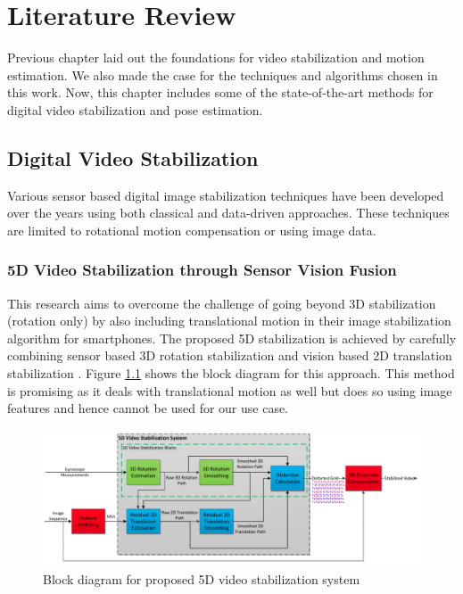 \chapter{Literature Review} \label{chapter_three}

Previous chapter laid out the foundations for video stabilization and motion estimation. We also made the case for the techniques and algorithms chosen in this work. Now, this chapter includes some of the state-of-the-art methods for digital video stabilization and pose estimation. 

\section{Digital Video Stabilization}
Various sensor based digital image stabilization techniques have been developed over the years using both classical and data-driven approaches. These techniques are limited to rotational motion compensation or using image data.

\subsection{5D Video Stabilization through Sensor Vision Fusion}
This research aims to overcome the challenge of going beyond 3D stabilization (rotation only) by also including translational motion in their image stabilization algorithm for smartphones. The proposed 5D stabilization is achieved by carefully combining sensor based 3D rotation stabilization and vision based 2D translation stabilization \citep{zhuang20195d}. Figure \ref{fig:5d_stab} shows the block diagram for this approach. This method is promising as it deals with translational motion as well but does so using image features and hence cannot be used for our use case.

\begin{figure}
    \centering
    \includegraphics[scale=0.21]{images/fig_chapter3/5d_stab.png}
    \caption{Block diagram for proposed 5D video stabilization system \citep{zhuang20195d}} 
    \label{fig:5d_stab}
\end{figure}

